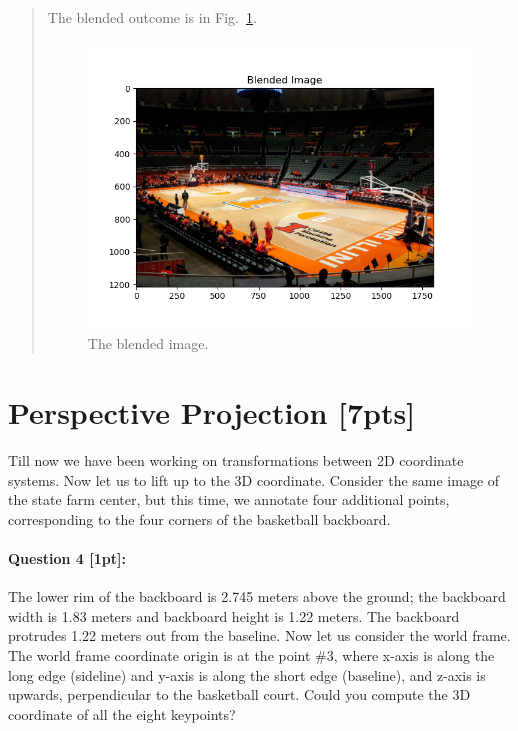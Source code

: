 \documentclass[11pt]{article}
\begin{document}
\begin{itemize}
\begin{quote}
    The blended outcome is in Fig.~\ref{fig:blended_image}.
    \begin{figure}[h]
        \centering
        \includegraphics[width=0.7\linewidth]{Q3-C.png}
        \caption{The blended image.}
        \label{fig:blended_image}
    \end{figure}

\end{quote}

\end{itemize}

\clearpage

\section*{Perspective Projection [7pts]}
Till now we have been working on transformations between 2D coordinate systems. Now let us to lift up to the 3D coordinate. Consider the same image of the state farm center, but this time, we annotate four additional points, corresponding to the four corners of the basketball backboard. 

\paragraph{Question 4 [1pt]:} 
The lower rim of the backboard is 2.745 meters above the ground; the backboard width is 1.83 meters and backboard height is 1.22 meters. The backboard protrudes 1.22 meters out from the baseline. Now let us consider the world frame. The world frame coordinate origin is at the point \#3, where x-axis is along the long edge (sideline) and y-axis is along the short edge (baseline), and z-axis is upwards, perpendicular to the basketball court.   Could you compute the 3D coordinate of all the eight keypoints?
\end{document}
